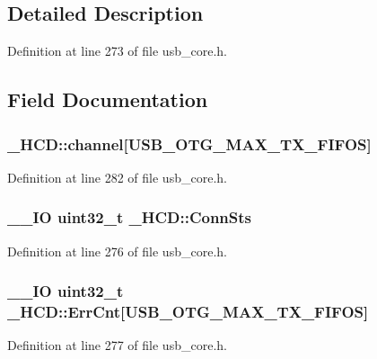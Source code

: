 \subsection{Detailed Description}


Definition at line 273 of file usb\-\_\-core.\-h.



\subsection{Field Documentation}
\hypertarget{struct___h_c_d_ae40b6fed9fa4953125333783c0424da8}{
\subsubsection[{channel}]{ \-\_\-\-H\-C\-D\-::channel\mbox{[}U\-S\-B\-\_\-\-O\-T\-G\-\_\-\-M\-A\-X\-\_\-\-T\-X\-\_\-\-F\-I\-F\-O\-S\mbox{]}}}\label{struct___h_c_d_ae40b6fed9fa4953125333783c0424da8}


Definition at line 282 of file usb\-\_\-core.\-h.

\hypertarget{struct___h_c_d_adcd85817e79354756642ab97f9420332}{
\subsubsection[{Conn\-Sts}]{\setlength{\rightskip}{0pt plus 5cm}\-\_\-\-\_\-\-I\-O {\bf uint32\-\_\-t} \-\_\-\-H\-C\-D\-::\-Conn\-Sts}}\label{struct___h_c_d_adcd85817e79354756642ab97f9420332}


Definition at line 276 of file usb\-\_\-core.\-h.

\hypertarget{struct___h_c_d_a6c115973924bf07cf5782105e4d4e7ef}{
\subsubsection[{Err\-Cnt}]{\setlength{\rightskip}{0pt plus 5cm}\-\_\-\-\_\-\-I\-O {\bf uint32\-\_\-t} \-\_\-\-H\-C\-D\-::\-Err\-Cnt\mbox{[}U\-S\-B\-\_\-\-O\-T\-G\-\_\-\-M\-A\-X\-\_\-\-T\-X\-\_\-\-F\-I\-F\-O\-S\mbox{]}}}\label{struct___h_c_d_a6c115973924bf07cf5782105e4d4e7ef}


Definition at line 277 of file usb\-\_\-core.\-h.

